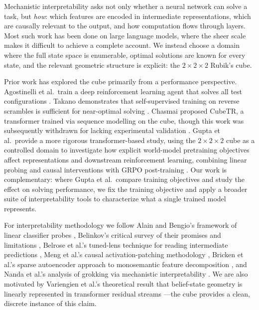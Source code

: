 \documentclass[12pt]{article}
\begin{document}
Mechanistic interpretability asks not only whether a neural network can solve a
task, but \emph{how}: which features are encoded in intermediate representations,
which are causally relevant to the output, and how computation flows through
layers.  Most such work has been done on large language models, where the sheer
scale makes it difficult to achieve a complete account.  We instead choose a
domain where the full state space is enumerable, optimal solutions are known for
every state, and the relevant geometric structure is explicit: the $2{\times}2{\times}2$
Rubik's cube.

Prior work has explored the cube primarily from a performance perspective.
Agostinelli et al.\ train a deep reinforcement learning agent that solves all
test configurations \cite{agostinelli2019deepcubea}.  Takano demonstrates that
self-supervised training on reverse scrambles is sufficient for near-optimal
solving \cite{takano2021selfsupervision}.  Chasmai proposed CubeTR, a transformer trained via sequence modelling on the
cube, though this work was subsequently withdrawn for lacking experimental
validation \cite{chasmai2021cubetr}.  Gupta et al.\ provide a more rigorous
transformer-based study, using the $2{\times}2{\times}2$ cube as a controlled
domain to investigate how explicit world-model pretraining objectives affect
representations and downstream reinforcement learning, combining linear probing
and causal interventions with GRPO post-training
\cite{gupta2024worldmodels}.  Our work is complementary: where Gupta et al.\
compare training objectives and study the effect on solving performance, we fix
the training objective and apply a broader suite of interpretability tools to
characterize what a single trained model represents.

For interpretability methodology we follow Alain and Bengio's framework of
linear classifier probes \cite{alain2016probes}, Belinkov's critical survey of
their promises and limitations \cite{belinkov2022probing}, Belrose et al.'s
tuned-lens technique for reading intermediate predictions \cite{belrose2023tunedlens},
Meng et al.'s causal activation-patching methodology
\cite{meng2022locatingfactual}, Bricken et al.'s sparse autoencoder approach
to monosemantic feature decomposition \cite{bricken2023monosemantic}, and
Nanda et al.'s analysis of grokking via mechanistic interpretability
\cite{nanda2023grokking}.  We are also motivated by Variengien et al.'s
theoretical result that belief-state geometry is linearly represented in
transformer residual streams \cite{variengien2024beliefstate}---the cube
provides a clean, discrete instance of this claim.
\end{document}
